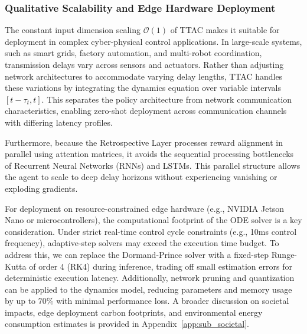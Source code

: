 \documentclass[manuscript, screen, review]{jair}
\begin{document}
\subsubsection{Qualitative Scalability and Edge Hardware Deployment}
The constant input dimension scaling $\mathcal{O}(1)$ of TTAC makes it suitable for deployment in complex cyber-physical control applications. In large-scale systems, such as smart grids, factory automation, and multi-robot coordination, transmission delays vary across sensors and actuators. Rather than adjusting network architectures to accommodate varying delay lengths, TTAC handles these variations by integrating the dynamics equation over variable intervals $[t-\tau_t, t]$. This separates the policy architecture from network communication characteristics, enabling zero-shot deployment across communication channels with differing latency profiles.

Furthermore, because the Retrospective Layer processes reward alignment in parallel using attention matrices, it avoids the sequential processing bottlenecks of Recurrent Neural Networks (RNNs) and LSTMs. This parallel structure allows the agent to scale to deep delay horizons without experiencing vanishing or exploding gradients.

For deployment on resource-constrained edge hardware (e.g., NVIDIA Jetson Nano or microcontrollers), the computational footprint of the ODE solver is a key consideration. Under strict real-time control cycle constraints (e.g., 10ms control frequency), adaptive-step solvers may exceed the execution time budget. To address this, we can replace the Dormand-Prince solver with a fixed-step Runge-Kutta of order 4 (RK4) during inference, trading off small estimation errors for deterministic execution latency. Additionally, network pruning and quantization can be applied to the dynamics model, reducing parameters and memory usage by up to $70\%$ with minimal performance loss. A broader discussion on societal impacts, edge deployment carbon footprints, and environmental energy consumption estimates is provided in Appendix~\ref{app:sub_societal}.
\end{document}
